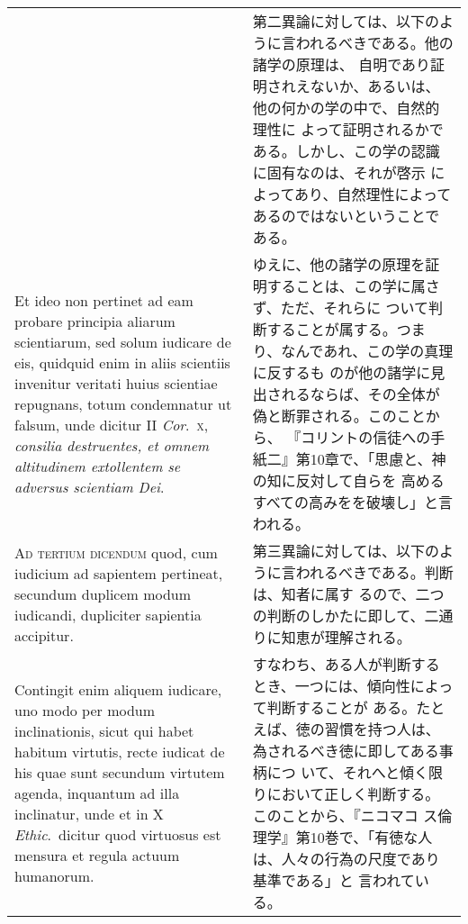 \documentclass[10pt]{jsarticle}
\begin{document}
\begin{longtable}{p{21em}p{21em}}
&

第二異論に対しては、以下のように言われるべきである。他の諸学の原理は、
自明であり証明されえないか、あるいは、他の何かの学の中で、自然的理性に
よって証明されるかである。しかし、この学の認識に固有なのは、それが啓示
によってあり、自然理性によってあるのではないということである。

\\

Et ideo non pertinet ad eam probare principia aliarum scientiarum, sed
solum iudicare de eis, quidquid enim in aliis scientiis invenitur
veritati huius scientiae repugnans, totum condemnatur ut falsum, unde
dicitur II {\itshape Cor}.~{\scshape x}, {\itshape consilia
destruentes, et omnem altitudinem extollentem se adversus scientiam
Dei}.


&

ゆえに、他の諸学の原理を証明することは、この学に属さず、ただ、それらに
ついて判断することが属する。つまり、なんであれ、この学の真理に反するも
のが他の諸学に見出されるならば、その全体が偽と断罪される。このことから、
『コリントの信徒への手紙二』第10章で、「思慮と、神の知に反対して自らを
高めるすべての高みをを破壊し」と言われる。


\\


{\scshape Ad tertium dicendum} quod, cum iudicium ad sapientem
pertineat, secundum duplicem modum iudicandi, dupliciter sapientia
accipitur.

&

第三異論に対しては、以下のように言われるべきである。判断は、知者に属す
るので、二つの判断のしかたに即して、二通りに知恵が理解される。


\\

Contingit enim aliquem iudicare, uno modo per modum inclinationis,
sicut qui habet habitum virtutis, recte iudicat de his quae sunt
secundum virtutem agenda, inquantum ad illa inclinatur, unde et in X
{\itshape Ethic}.~dicitur quod virtuosus est mensura et regula actuum
humanorum.

&

すなわち、ある人が判断するとき、一つには、傾向性によって判断することが
ある。たとえば、徳の習慣を持つ人は、為されるべき徳に即してある事柄につ
いて、それへと傾く限りにおいて正しく判断する。このことから、『ニコマコ
ス倫理学』第10巻で、「有徳な人は、人々の行為の尺度であり基準である」と
言われている。


\\


\end{longtable}
\end{document}
